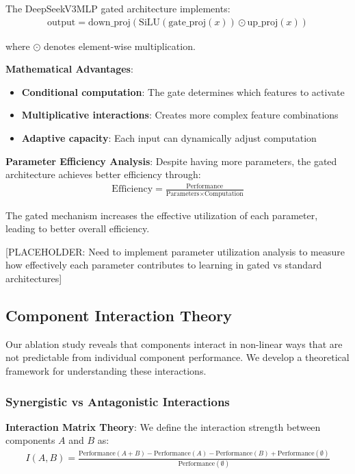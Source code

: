 \documentclass[11pt,a4paper]{article}
\begin{document}
The DeepSeekV3MLP gated architecture implements:
\begin{align}
\text{output} = \text{down\_proj}(\text{SiLU}(\text{gate\_proj}(x)) \odot \text{up\_proj}(x))
\end{align}

where $\odot$ denotes element-wise multiplication.

\textbf{Mathematical Advantages}:
\begin{itemize}
    \item \textbf{Conditional computation}: The gate determines which features to activate
    \item \textbf{Multiplicative interactions}: Creates more complex feature combinations
    \item \textbf{Adaptive capacity}: Each input can dynamically adjust computation
\end{itemize}

\textbf{Parameter Efficiency Analysis}:
Despite having more parameters, the gated architecture achieves better efficiency through:
\begin{align}
\text{Efficiency} = \frac{\text{Performance}}{\text{Parameters} \times \text{Computation}}
\end{align}

The gated mechanism increases the effective utilization of each parameter, leading to better overall efficiency.

[PLACEHOLDER: Need to implement parameter utilization analysis to measure how effectively each parameter contributes to learning in gated vs standard architectures]

\subsection{Component Interaction Theory}

Our ablation study reveals that components interact in non-linear ways that are not predictable from individual component performance. We develop a theoretical framework for understanding these interactions.

\subsubsection{Synergistic vs Antagonistic Interactions}

\textbf{Interaction Matrix Theory}:
We define the interaction strength between components $A$ and $B$ as:
\begin{align}
I(A, B) = \frac{\text{Performance}(A + B) - \text{Performance}(A) - \text{Performance}(B) + \text{Performance}(\emptyset)}{\text{Performance}(\emptyset)}
\end{align}
\end{document}
